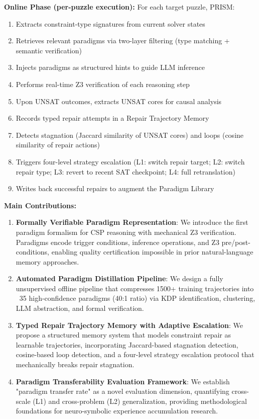 \documentclass[letterpaper]{article}
\begin{document}
\textbf{Online Phase (per-puzzle execution):} For each target puzzle, PRISM:
\begin{enumerate}
    \item Extracts constraint-type signatures from current solver states
    \item Retrieves relevant paradigms via two-layer filtering (type matching + semantic verification)
    \item Injects paradigms as structured hints to guide LLM inference
    \item Performs real-time Z3 verification of each reasoning step
    \item Upon UNSAT outcomes, extracts UNSAT cores for causal analysis
    \item Records typed repair attempts in a Repair Trajectory Memory
    \item Detects stagnation (Jaccard similarity of UNSAT cores) and loops (cosine similarity of repair actions)
    \item Triggers four-level strategy escalation (L1: switch repair target; L2: switch repair type; L3: revert to recent SAT checkpoint; L4: full retranslation)
    \item Writes back successful repairs to augment the Paradigm Library
\end{enumerate}

\textbf{Main Contributions:}

\begin{enumerate}
    \item \textbf{Formally Verifiable Paradigm Representation}: We introduce the first paradigm formalism for CSP reasoning with mechanical Z3 verification. Paradigms encode trigger conditions, inference operations, and Z3 pre/post-conditions, enabling quality certification impossible in prior natural-language memory approaches.

    \item \textbf{Automated Paradigm Distillation Pipeline}: We design a fully unsupervised offline pipeline that compresses 1500+ training trajectories into ~35 high-confidence paradigms (40:1 ratio) via KDP identification, clustering, LLM abstraction, and formal verification.

    \item \textbf{Typed Repair Trajectory Memory with Adaptive Escalation}: We propose a structured memory system that models constraint repair as learnable trajectories, incorporating Jaccard-based stagnation detection, cosine-based loop detection, and a four-level strategy escalation protocol that mechanically breaks repair stagnation.

    \item \textbf{Paradigm Transferability Evaluation Framework}: We establish "paradigm transfer rate" as a novel evaluation dimension, quantifying cross-scale (L1) and cross-problem (L2) generalization, providing methodological foundations for neuro-symbolic experience accumulation research.
\end{enumerate}
\end{document}
